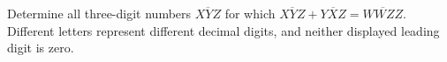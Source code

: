 Determine all three-digit numbers $\overline{XYZ}$ for which $\overline{XYZ}+\overline{YXZ}=\overline{WWZZ}$. Different letters represent different decimal digits, and neither displayed leading digit is zero.
